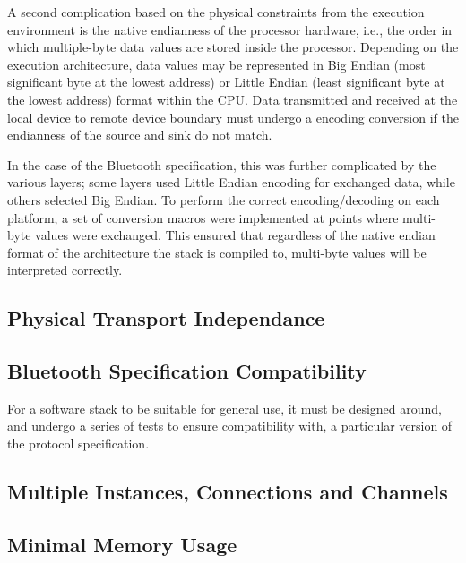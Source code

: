A second complication based on the physical constraints from the execution environment is the native endianness of the processor hardware, i.e., the order in which multiple-byte data values are stored inside the processor. Depending on the execution architecture, data values may be represented in Big Endian (most significant byte at the lowest address) or Little Endian (least significant byte at the lowest address) format within the CPU. Data transmitted and received at the local device to remote device boundary must undergo a encoding conversion if the endianness of the source and sink do not match.

In the case of the Bluetooth specification, this was further complicated by the various layers; some layers used Little Endian encoding for exchanged data, while others selected Big Endian. To perform the correct encoding/decoding on each platform, a set of conversion macros were implemented at points where multi-byte values were exchanged. This ensured that regardless of the native endian format of the architecture the stack is compiled to, multi-byte values will be interpreted correctly.

\FloatBarrier
\subsection{Physical Transport Independance}


\FloatBarrier
\subsection{Bluetooth Specification Compatibility}

For a software stack to be suitable for general use, it must be designed around, and undergo a series of tests to ensure compatibility with, a particular version of the protocol specification. 


\FloatBarrier
\subsection{Multiple Instances, Connections and Channels}


\FloatBarrier
\subsection{Minimal Memory Usage}

